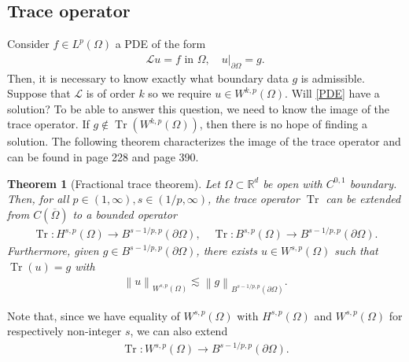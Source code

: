 \documentclass[
    a4paper,
    DIV=14,
    abstract=true,
    numbers=noenddot
]
{scrartcl}
\newtheorem{theorem}{Theorem}[section]
\theoremstyle{definition}
\renewcommand{\norm}[1]{\left\lVert #1 \right\rVert}\renewcommand{\abs}[1]{\left| #1 \right|}
\newcommand\restr[2]{\left.#1\right|_{#2}}
\newcommand{\R}{\mathbb{R}}
\newcommand{\Ll}{\mathcal{L}}
\begin{document}
\subsection{Trace operator}
Consider $f \in L^p(\Omega )$  a PDE of the form
\begin{align}\label{PDE}
    \Ll u =f \text{ in } \Omega , \quad \restr{u}{\partial \Omega }= g.
\end{align}
Then, it is necessary to know exactly what boundary data $g$ is admissible. Suppose that $\Ll $ is of order $k$ so we require  $u \in W^{k,p}(\Omega )$. Will \eqref{PDE} have a solution? To be able to answer this question, we need to know the image of the trace operator. If $g \notin \operatorname{Tr}(W^{k,p}(\Omega ))$, then there is no hope of finding a solution. The following theorem characterizes the image of the trace operator and can be found in \cite{agranovich2015sobolev} page 228 and \cite{leoni2023first} page 390.
\begin{theorem}[Fractional trace theorem]\label{trace theorem}
    Let $\Omega \subset \R^d$ be open with $C^{0,1}$ boundary. Then, for all  $p\in (1,\infty), s\in (1/p,\infty) $, the trace operator $\operatorname{Tr}$ can be extended from $C(\overline{\Omega } )$  to a bounded operator
    \begin{align*}
        \operatorname{Tr}: H^{s,p}(\Omega ) \to B^{s-1/p,p}(\partial\Omega), \quad \operatorname{Tr}: B^{s,p}(\Omega ) \to B^{s-1/p,p}(\partial\Omega).
    \end{align*}
    Furthermore, given $g \in B^{s-1/p,p}(\partial\Omega)$, there exists $u \in W^{s,p}(\Omega )$ such that $\operatorname{Tr}(u)=g$ with
    \begin{align*}
        \norm{u}_{W^{s,p}(\Omega )}\lesssim \norm{g}_{B^{s-1/p,p}(\partial\Omega)}.
    \end{align*}
\end{theorem}
Note that, since we have equality of $W^{s,p}(\Omega )$ with $H^{s,p}(\Omega )$ and $W^{s,p}(\Omega )$ for respectively non-integer  $s$, we can also extend
\begin{align*}
    \operatorname{Tr}: W^{s,p}(\Omega ) \to B^{s-1/p,p}(\partial\Omega).
\end{align*}
\end{document}
